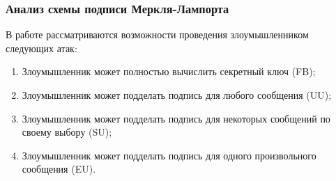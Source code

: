 \documentclass{./civarticle}
\begin{document}
\begin{figure}[h!]
\end{figure}

\begin{figure}[h!]
\end{figure}

\subsubsection{Анализ схемы подписи Меркля-Лампорта}

В работе \cite{lamport1} рассматриваются возможности проведения злоумышленником следующих атак: 

\begin{enumerate}
    \item Злоумышленник может полностью вычислить секретный ключ (FB);
    \item Злоумышленник может подделать подпись для любого сообщения (UU);
    \item Злоумышленник может подделать подпись для некоторых сообщений по своему выбору (SU);
    \item Злоумышленник может подделать подпись для одного произвольного сообщения (EU).
\end{enumerate}
\end{document}
